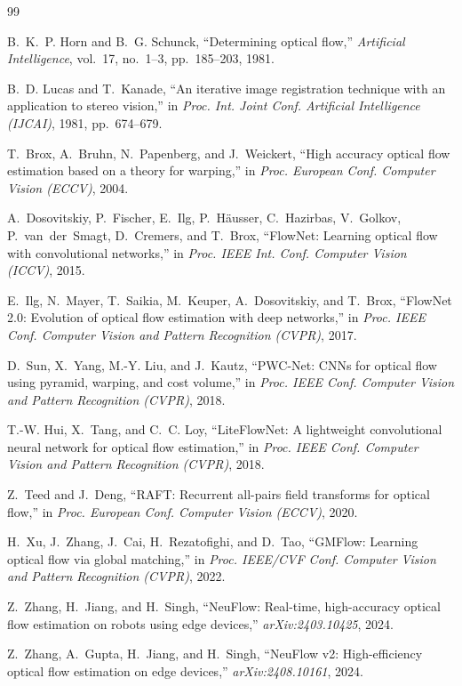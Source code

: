 \documentclass[11pt,a4paper]{article}
\begin{document}
\begingroup
\small
\begin{thebibliography}{99}

B.~K.~P. Horn and B.~G. Schunck, ``Determining optical flow,'' \emph{Artificial
Intelligence}, vol.~17, no.~1--3, pp.~185--203, 1981.

B.~D. Lucas and T.~Kanade, ``An iterative image registration technique with an
application to stereo vision,'' in \emph{Proc. Int. Joint Conf. Artificial
Intelligence (IJCAI)}, 1981, pp.~674--679.

T.~Brox, A.~Bruhn, N.~Papenberg, and J.~Weickert, ``High accuracy optical flow
estimation based on a theory for warping,'' in \emph{Proc. European Conf.
Computer Vision (ECCV)}, 2004.

A.~Dosovitskiy, P.~Fischer, E.~Ilg, P.~H\"{a}usser, C.~Hazirbas, V.~Golkov,
P.~van~der~Smagt, D.~Cremers, and T.~Brox, ``FlowNet: Learning optical flow with
convolutional networks,'' in \emph{Proc. IEEE Int. Conf. Computer Vision (ICCV)},
2015.

E.~Ilg, N.~Mayer, T.~Saikia, M.~Keuper, A.~Dosovitskiy, and T.~Brox, ``FlowNet
2.0: Evolution of optical flow estimation with deep networks,'' in \emph{Proc.
IEEE Conf. Computer Vision and Pattern Recognition (CVPR)}, 2017.

D.~Sun, X.~Yang, M.-Y. Liu, and J.~Kautz, ``PWC-Net: CNNs for optical flow using
pyramid, warping, and cost volume,'' in \emph{Proc. IEEE Conf. Computer Vision
and Pattern Recognition (CVPR)}, 2018.

T.-W. Hui, X.~Tang, and C.~C. Loy, ``LiteFlowNet: A lightweight convolutional
neural network for optical flow estimation,'' in \emph{Proc. IEEE Conf. Computer
Vision and Pattern Recognition (CVPR)}, 2018.

Z.~Teed and J.~Deng, ``RAFT: Recurrent all-pairs field transforms for optical
flow,'' in \emph{Proc. European Conf. Computer Vision (ECCV)}, 2020.

H.~Xu, J.~Zhang, J.~Cai, H.~Rezatofighi, and D.~Tao, ``GMFlow: Learning optical
flow via global matching,'' in \emph{Proc. IEEE/CVF Conf. Computer Vision and
Pattern Recognition (CVPR)}, 2022.

Z.~Zhang, H.~Jiang, and H.~Singh, ``NeuFlow: Real-time, high-accuracy optical
flow estimation on robots using edge devices,'' \emph{arXiv:2403.10425}, 2024.

Z.~Zhang, A.~Gupta, H.~Jiang, and H.~Singh, ``NeuFlow v2: High-efficiency optical
flow estimation on edge devices,'' \emph{arXiv:2408.10161}, 2024.


\end{thebibliography}
\end{document}
